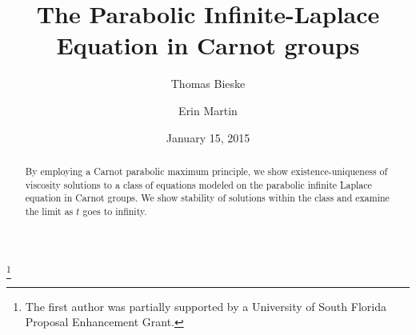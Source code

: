 \documentclass[12pt]{amsart}
\theoremstyle{definition}
\theoremstyle{remark}
\numberwithin{equation}{section}
\begin{document}
\begin{abstract}By employing a Carnot parabolic maximum principle, we show existence-uniqueness of viscosity solutions to a class of equations modeled on the parabolic infinite Laplace equation in Carnot groups. We show stability of solutions within the class and examine the limit as $t$ goes to infinity. 
\end{abstract}
\title{The Parabolic Infinite-Laplace Equation in Carnot groups}
\author{Thomas Bieske}
\thanks{The first author was partially supported by a University of South Florida Proposal Enhancement Grant.}
\author{Erin Martin}
\address{Department of Mathematics and Statistics\\
University of South Florida\\ 
4202 E. Fowler Ave. CMC342\\
Tampa, FL 33620, USA}
\address{Department of Mathematics and Physics\\
Westminster College\\
501 Westminster Ave\\ 
Fulton, MO 65251, USA}
\date{January 15, 2015}
\maketitle
\end{document}
